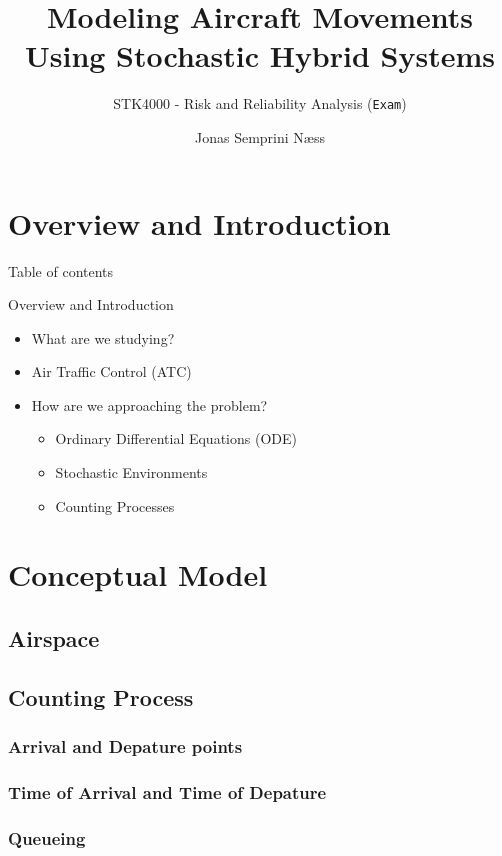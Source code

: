 \documentclass[UKenglish]{beamer}
\author{Jonas Semprini Næss}
\title{Modeling Aircraft Movements Using Stochastic Hybrid Systems}
\subtitle{STK4000 - Risk and Reliability Analysis (\texttt{Exam})}
\begin{document}
\section{Overview and Introduction}
%
%
\begin{frame}[allowframebreaks]{Table of contents}
\end{frame}
\begin{frame}{Overview and Introduction}
\begin{itemize}
    \setlength{\itemsep}{7mm}
    \vspace{7mm}
    \item What are we studying?
    \item Air Traffic Control (ATC)
    \item How are we approaching the problem?
    \begin{itemize}
        \item Ordinary Differential Equations (ODE) 
        \item Stochastic Environments 
        \item Counting Processes 
    \end{itemize}
\end{itemize}
\end{frame}

\section{Conceptual Model}
\subsection{Airspace}
\subsection{Counting Process}
\subsubsection{Arrival and Depature points}
\subsubsection{Time of Arrival and Time of Depature}
\subsubsection{Queueing}
\end{document}
